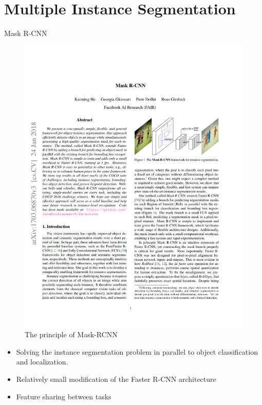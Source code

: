 \documentclass[xcolor=pdftex,dvipsnames,table]{beamer}
\begin{document}
\section{Multiple Instance Segmentation}
\begin{frame}{Mask R-CNN}
\begin{figure}[htb]
   \centering
   \includegraphics[width=.7\textwidth]{../graphics/Mask_RCNN_principle.pdf}
   \caption{The principle of Mask-RCNN}
\end{figure}
\begin{itemize}
\item Solving the instance segmentation problem in parallel to object classification and localization. 
\item Relatively small modification of the Faster R-CNN architecture
\item Feature sharing between tasks
\end{itemize}
\end{frame}
\end{document}
